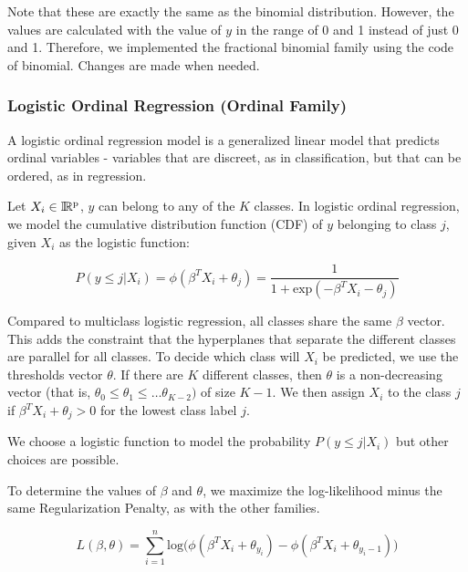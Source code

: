 Note that these are exactly the same as the binomial distribution.  However, the values are  calculated with the value of $y$ in the range of 0 and 1 instead of just 0 and 1.  Therefore, we implemented the fractional binomial family using the code of binomial.  Changes are made when needed.

\waterExampleInR


\waterExampleInPython


\subsubsection{Logistic Ordinal Regression (Ordinal Family)}

A logistic ordinal regression model is a generalized linear model that predicts ordinal variables - variables that are discreet, as in classification, but that can be ordered, as in regression.

Let $X_i\in\rm \Bbb I \!\Bbb R^{p}$, $y$ can belong to any of the $K$ classes. In logistic ordinal regression, we model the cumulative distribution function (CDF) of $y$ belonging to class $j$, given $X_i$ as the logistic function:

$$P(y \leq j|X_i) = \phi(\beta^{T}X_i + \theta_j) = \dfrac {1} {1+ \text{exp} (-\beta^{T}X_i - \theta_j)}$$

Compared to multiclass logistic regression, all classes share the same $\beta$ vector. This adds the constraint that the hyperplanes that separate the different classes are parallel for all classes. To decide which class will $X_i$ be predicted, we use the thresholds vector $\theta$. If there are $K$ different classes, then $\theta$ is a non-decreasing vector (that is, $\theta_0 \leq \theta_1 \leq \ldots \theta_{K-2})$ of size $K-1$. We then assign $X_i$ to the class $j$ if $\beta^{T}X_i + \theta_j > 0$ for the lowest class label $j$.

We choose a logistic function to model the probability $P(y \leq j|X_i)$ but other choices are possible. 

To determine the values of $\beta$ and $\theta$, we maximize the log-likelihood minus the same Regularization Penalty, as with the other families. 

$$L(\beta,\theta) = \sum_{i=1}^{n} \text{log} \big( \phi (\beta^{T}X_i + \theta_{y_i}) - \phi(\beta^{T}X_i + \theta_{{y_i}-1}) \big)$$

